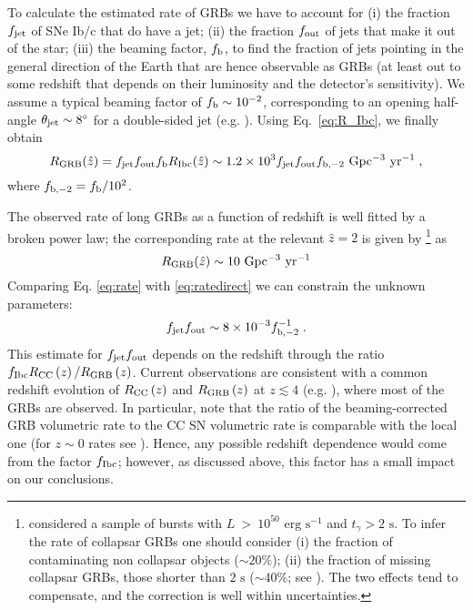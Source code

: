 \documentclass[useAMS,usenatbib]{mn2e}
\begin{document}
To calculate the estimated rate of GRBs we have to account for (i) the fraction $f_{\rm jet}$ of SNe Ib/c that do have a jet; (ii) the fraction $f_{\rm out}$ of jets that make it out of the star; (iii) the beaming factor, $f_{\rm b}$, to find the fraction of jets pointing in the general direction of the Earth that are hence observable as GRBs (at least out to some redshift that depends on their luminosity and the detector's sensitivity). We assume a typical beaming factor of $f_{\rm b}\sim 10^{-2}$, corresponding to an opening half-angle $\theta_{\rm jet}\sim 8^\circ$ for a double-sided jet (e.g. \citealt{Frail2001,Bloom2003,Guetta2005,Friedman2005,LeDermer2007}). Using Eq.~\eqref{eq:R_Ibc}, we finally obtain
\begin{equation}
\label{eq:rate}
R_{\rm GRB}(\hat{z})=f_{\rm jet}f_{\rm out}f_{\rm b}R_{\rm Ibc}(\hat{z})\sim 1.2\times 10^3 f_{\rm jet} f_{\rm out} f_{\rm b,-2}\text{ Gpc$^{-3}$ yr$^{-1}$}\;,
\end{equation}
where $f_{\rm b,-2}=f_{\rm b}/10^2$.

The observed rate of long GRBs as a function of redshift is well fitted by a broken power law; the corresponding rate at the relevant $\hat{z}=2$ is given by \citet{WandermanPiran2010}\footnote{\citet{WandermanPiran2010} considered a sample of bursts with $L~>~10^{50}\text{ erg s$^{-1}$}$ and $t_\gamma>2\text{ s}$. To infer the rate of collapsar GRBs one should consider (i) the fraction of contaminating non collapsar objects ($\sim 20\%$); (ii) the fraction of missing collapsar GRBs, those shorter than $2\text{ s}$ ($\sim 40\%$; see \citealt{Bromberg2013}). The two effects tend to compensate, and the correction is well within uncertainties.} as
\begin{equation} \label{eq:ratedirect}
R_{\rm GRB}(\hat{z})\sim 10\text{ Gpc$^{-3}$ yr$^{-1}$}
\end{equation}
Comparing Eq. \eqref{eq:rate} with \eqref{eq:ratedirect} we can constrain the unknown parameters:
\begin{equation}
\label{eq:fout_1}
f_{\rm jet} f_{\rm out}\sim 8\times 10^{-3}f_{\rm b,-2}^{-1}\;.
\end{equation}
This estimate for $f_{\rm jet} f_{\rm out}$ depends on the redshift through the ratio $f_{\rm Ibc}R_{\rm CC}\left(z\right)/R_{\rm GRB}\left(z\right)$. Current observations are consistent with a common redshift evolution of $R_{\rm CC}\left(z\right)$ and $R_{\rm GRB}\left(z\right)$ at $z\lesssim 4$ (e.g. \citealt{RobertsonEllis2012}), where most of the GRBs are observed. In particular, note that the ratio of the beaming-corrected GRB volumetric rate to the CC SN volumetric rate is comparable with the local one (for $z\sim 0$ rates see \citealt{GuettaDellavalle2007}). Hence, any possible redshift dependence would come from the factor $f_{\rm Ibc}$; however, as discussed above, this factor has a small impact on our conclusions.
\end{document}
